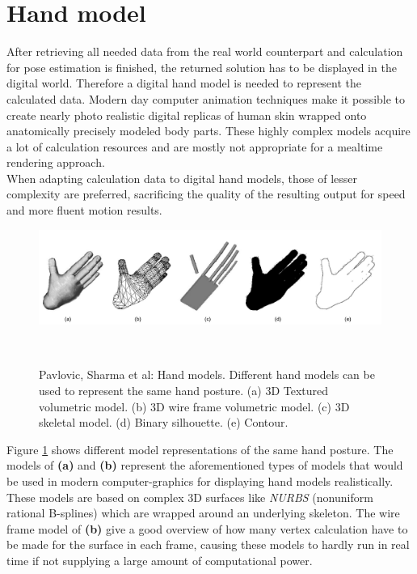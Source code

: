 \section{Hand model}
After retrieving all needed data from the real world counterpart and calculation for pose estimation is finished, the returned solution has to be displayed in the digital world. Therefore a digital hand model is needed to represent the calculated data. Modern day computer animation techniques make it possible to create nearly photo realistic digital replicas of human skin wrapped onto anatomically precisely modeled body parts. These highly complex models acquire a lot of calculation resources and are mostly not appropriate for a mealtime rendering approach.\\
When adapting calculation data to digital hand models, those of lesser complexity are preferred, sacrificing the quality of the resulting output for speed and more fluent motion results.
\begin{figure}[H]
\includegraphics[width=\textwidth]{images/Pavlovic-Sharmaetal.jpg}
\caption{Pavlovic, Sharma et al: Hand models. Different hand models can be used to represent the same hand posture. (a) 3D Textured volumetric model. (b) 3D wire frame volumetric model. (c) 3D skeletal model. (d) Binary silhouette. (e) Contour.}
~\cite[p.~682]{Pavlovic.1997}
\label{handmodels_detail_level}
\end{figure}
Figure \ref{handmodels_detail_level} shows different model representations of the same hand posture. The models of \textbf{(a)} and \textbf{(b)} represent the aforementioned types of models that would be used in modern computer-graphics for displaying hand models realistically.\\These models are based on complex 3D surfaces like \textit{NURBS} (nonuniform rational B-splines) which are wrapped around an underlying skeleton. The wire frame model of \textbf{(b)} give a good overview of how many vertex calculation have to be made for the surface in each frame, causing these models to hardly run in real time if not supplying a large amount of computational power.\\
